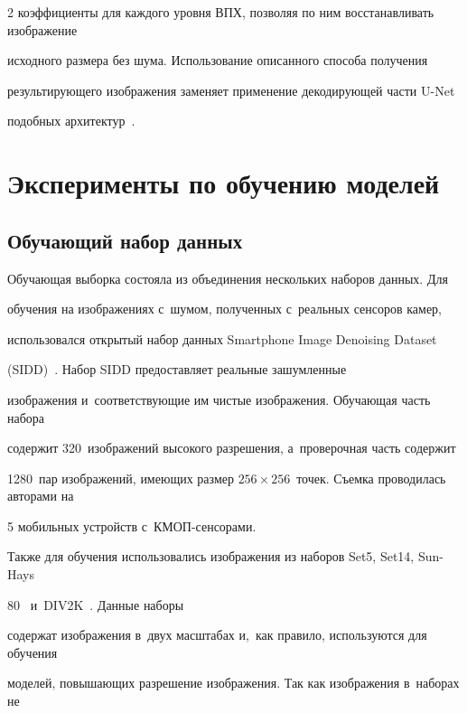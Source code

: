 \begin{multicols}{2}
коэффициенты для каждого уровня ВПХ, позволяя по ним восстанавливать изображение 


исходного размера без шума. Использование описанного способа получения 


результирующего изображения заменяет применение декодирующей части U-Net 


подобных архитектур~\cite{MWCNN, MDIWT}.





\section{Эксперименты по обучению моделей}





\subsection{Обучающий набор данных}





Обучающая выборка состояла из объединения нескольких наборов данных. Для 


обучения на изоб\-ра\-же\-ни\-ях с~шумом, полученных с~реальных сенсоров камер, 


использовался открытый набор данных Smartphone Image Denoising Dataset 


(SIDD)~\cite{SIDD_2018_CVPR}. Набор SIDD предоставляет реальные зашумленные 


изображения и~соответствующие им чистые изображения. Обучающая часть набора 


содержит 320~изображений высокого разрешения, а~проверочная часть содержит 


1280~пар изображений, имеющих размер $256\times 256$~точек. Съемка проводилась авторами на 


5 мобильных устройств с~КМОП-сен\-со\-рами.





Также для обучения использовались изображения из наборов Set5, Set14, Sun-Hays 


80~\cite{FOR_ADD_NOISE_DATASETS} и~DIV2K~\cite{DIV2KDataset}. Данные наборы 


содержат изображения в~двух масштабах и,~как правило, используются для обуче\-ния 


моделей, повышающих разрешение изображения. Так как изображения в~наборах не 



\end{multicols}
